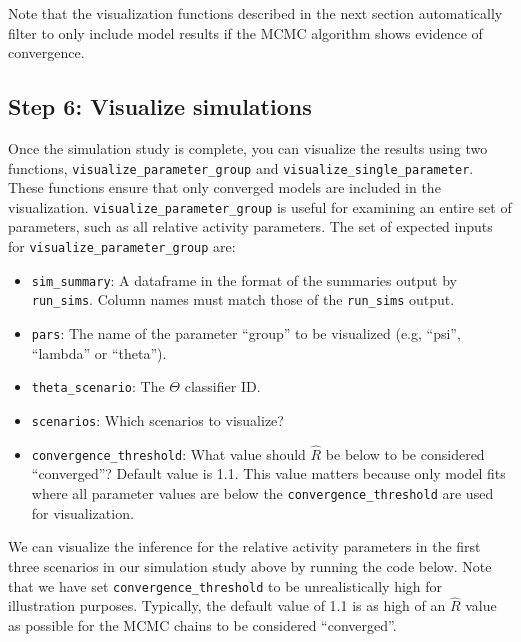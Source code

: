 \documentclass[
]{article}
\providecommand{\tightlist}{%
  \setlength{\itemsep}{0pt}\setlength{\parskip}{0pt}}
\begin{document}
\linespread{1}

Note that the visualization functions described in the next section automatically filter to only include model results if the MCMC algorithm shows evidence of convergence.

\hypertarget{step-6-visualize-simulations}{%
\subsection{Step 6: Visualize simulations}\label{step-6-visualize-simulations}}

Once the simulation study is complete, you can visualize the results using two functions, \texttt{visualize\_parameter\_group} and \texttt{visualize\_single\_parameter}. These functions ensure that only converged models are included in the visualization. \texttt{visualize\_parameter\_group} is useful for examining an entire set of parameters, such as all relative activity parameters. The set of expected inputs for \texttt{visualize\_parameter\_group} are:

\begin{itemize}
\tightlist
\item
  \texttt{sim\_summary}: A dataframe in the format of the summaries output by \texttt{run\_sims}. Column names must match those of the \texttt{run\_sims} output.
\item
  \texttt{pars}: The name of the parameter ``group'' to be visualized (e.g, ``psi'', ``lambda'' or ``theta'').
\item
  \texttt{theta\_scenario}: The \(\Theta\) classifier ID.
\item
  \texttt{scenarios}: Which scenarios to visualize?
\item
  \texttt{convergence\_threshold}: What value should \(\hat{R}\) be below to be considered ``converged''? Default value is 1.1. This value matters because only model fits where all parameter values are below the \texttt{convergence\_threshold} are used for visualization.
\end{itemize}

We can visualize the inference for the relative activity parameters in the first three scenarios in our simulation study above by running the code below. Note that we have set \texttt{convergence\_threshold} to be unrealistically high for illustration purposes. Typically, the default value of 1.1 is as high of an \(\hat{R}\) value as possible for the MCMC chains to be considered ``converged''.

\linespread{1}
\end{document}
